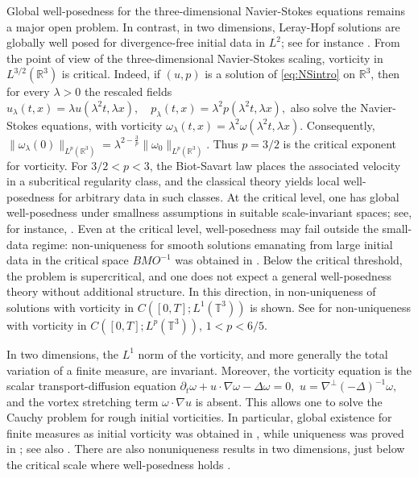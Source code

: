 \documentclass[11pt,a4paper]{article}
\newcommand{\R}{\mathbb{R}}
\newcommand{\T}{\mathbb{T}}
\begin{document}
Global well-posedness for the three-dimensional Navier-Stokes equations remains a major open problem. In contrast, in two dimensions, Leray-Hopf solutions are globally well posed for divergence-free initial data in $L^2$; see for instance \cite{lemarierieusset2002,RobinsonRodrigoSadowski16,cheminfourier}.
From the point of view of the three-dimensional Navier-Stokes scaling,
vorticity in $L^{3/2}(\R^3)$ is critical. Indeed, if $(u,p)$ is a solution of
\eqref{eq:NSintro} on $\R^3$, then for every $\lambda>0$ the rescaled fields
$
    u_\lambda(t,x)=\lambda u(\lambda^2t,\lambda x),
    \quad
    p_\lambda(t,x)=\lambda^2 p(\lambda^2t,\lambda x),
$
also solve the Navier-Stokes equations, with vorticity
$
    \omega_\lambda(t,x)=\lambda^2\omega(\lambda^2t,\lambda x).
$
Consequently,
$
    \|\omega_\lambda(0)\|_{L^p(\mathbb R^3)}
    =
    \lambda^{2-\frac3p}
    \|\omega_0\|_{L^p(\mathbb R^3)}.
$
Thus $p=3/2$ is the critical exponent for vorticity. For $3/2<p<3$, the
Biot-Savart law places the associated velocity in a subcritical regularity
class, and the classical theory
\cite{kato1984} yields local well-posedness for arbitrary data in such
classes. At the critical level, one has global well-posedness under
smallness assumptions in suitable scale-invariant spaces; see, for
instance, \cite{kato1984,kozonoyamazaki1994,kochtataru2001,gigamiyakawa1989}. Even at the critical level, well-posedness may fail outside the small-data regime: non-uniqueness for smooth solutions emanating from large initial data in the critical space $BMO^{-1}$ was obtained in \cite{coiculescu2026}.
Below the critical threshold, the problem is supercritical, and one does
not expect a general well-posedness theory without additional structure.
In this direction, in \cite{BuckmasterVicol19}  
non-uniqueness of solutions with vorticity in $C([0,T];L^1(\T^3))$ is shown. See \cite{JMS21} for non-uniqueness with vorticity in 
$C([0,T];L^p(\T^3))$, $1<p<6/5$. 

In two dimensions, the $L^1$ norm of the vorticity,
and more generally the total variation of a finite measure, are invariant. Moreover, the vorticity equation is the scalar
transport-diffusion equation
$
    \partial_t\omega+u\cdot\nabla\omega-\Delta\omega=0,
    \,\, u=\nabla^\perp(-\Delta)^{-1}\omega,
$
and the vortex stretching term $\omega\cdot\nabla  u$ is absent. This allows one to solve the
Cauchy problem for rough initial vorticities. In particular, global
existence for finite measures as initial vorticity was obtained in
\cite{cottet1986,giga1988}, while uniqueness was proved in
\cite{gallaghergallaylions2005,gallaghergallay2005}; see also
\cite{gallaywayne2005,gallay2012,bedrossianmasmoudi2014}. There are also nonuniqueness results in two dimensions, just below the critical scale where well-posedness holds \cite{CheskidovLuo22,CheskidovLuo2023,BurczakHidalgoTorne2025}.
\end{document}
